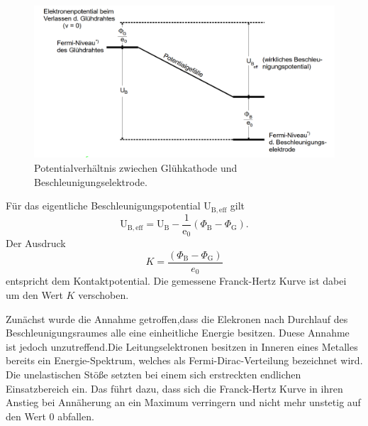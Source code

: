 \begin{figure}[H]
	\centering
	\includegraphics[width=1.0\linewidth]{content/grafik/potential.png}
	\caption{Potentialverhältnis zwiechen Glühkathode und Beschleunigungselektrode. \cite{franck}}
	\label{fig:potential}
\end{figure}

Für das eigentliche Beschleunigungspotential $\mathrm{U}_{\mathrm{B}, \mathrm{eff}}$ gilt 
\begin{equation}
    \mathrm{U}_{\mathrm{B}, \mathrm{eff}}=\mathrm{U}_{\mathrm{B}}-\frac{1}{\mathrm{e}_0}\left(\Phi_{\mathrm{B}}-\Phi_{\mathrm{G}}\right).
    \label{eqn:potential}
\end{equation}
Der Ausdruck 
\begin{equation}
    K = \frac{\left( \Phi_\text{B} - \Phi_\text{G} \right)}{e_0} 
    \label{eq:Kontaktpotential} 
\end{equation}
entspricht dem Kontaktpotential. Die gemessene Franck-Hertz Kurve ist dabei um den Wert $K$ verschoben.

Zunächst wurde die Annahme getroffen,dass die Elekronen nach Durchlauf des Beschleunigungsraumes alle eine einheitliche 
Energie besitzen. Duese Annahme ist jedoch unzutreffend.Die Leitungselektronen besitzen in Inneren eines Metalles bereits 
ein Energie-Spektrum, welches als Fermi-Dirac-Verteilung bezeichnet wird.
Die unelastischen Stöße setzten bei einem sich erstreckten endlichen Einsatzbereich ein. Das führt dazu, dass
sich die Franck-Hertz Kurve in ihren Anstieg bei Annäherung an ein Maximum verringern und nicht mehr unstetig auf den Wert 0 abfallen.

